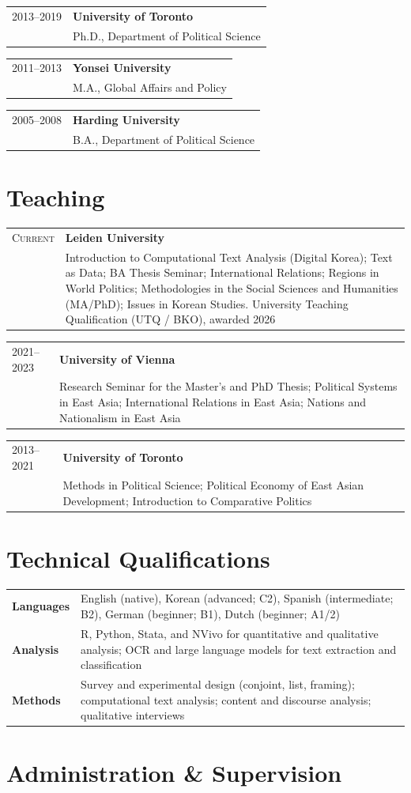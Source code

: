 \documentclass[11pt, a4paper]{article}
\makeatletter
\newcommand{\cventry}[3]{%
  \noindent
  \begin{tabularx}{\textwidth}{@{}p{2.4cm}X@{}}
    \textsc{#1} & \textbf{#2} \\
                 & #3
  \end{tabularx}\vspace{0.05em}%
}
\makeatother
\begin{document}
\cventry{2013--2019}{University of Toronto}
  {Ph.D., Department of Political Science}

\cventry{2011--2013}{Yonsei University}
  {M.A., Global Affairs and Policy}

\cventry{2005--2008}{Harding University}
  {B.A., Department of Political Science}

\section{Teaching}

\cventry{Current}{Leiden University}
  {Introduction to Computational Text Analysis (Digital Korea); Text as Data; BA Thesis Seminar; International Relations; Regions in World Politics; Methodologies in the Social Sciences and Humanities (MA/PhD); Issues in Korean Studies. University Teaching Qualification (UTQ / BKO), awarded 2026}

\cventry{2021--2023}{University of Vienna}
  {Research Seminar for the Master's and PhD Thesis; Political Systems in East Asia; International Relations in East Asia; Nations and Nationalism in East Asia}

\cventry{2013--2021}{University of Toronto}
  {Methods in Political Science; Political Economy of East Asian Development; Introduction to Comparative Politics}

\section{Technical Qualifications}

\noindent\begin{tabularx}{\textwidth}{@{}p{2.4cm}X@{}}
  \textbf{Languages} & English (native), Korean (advanced; C2), Spanish (intermediate; B2), German (beginner; B1), Dutch (beginner; A1/2) \\[0.3em]
  \textbf{Analysis} & R, Python, Stata, and NVivo for quantitative and qualitative analysis; OCR and large language models for text extraction and classification \\[0.3em]
  \textbf{Methods} & Survey and experimental design (conjoint, list, framing); computational text analysis; content and discourse analysis; qualitative interviews
\end{tabularx}

\section{Administration \& Supervision}
\end{document}
